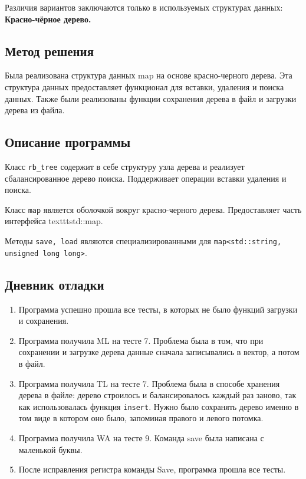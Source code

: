 \documentclass[12pt]{article}
\begin{document}
Различия вариантов заключаются только в используемых структурах данных:
\textbf{Красно-чёрное дерево.}

\newpage
\subsection*{Метод решения}

Была реализована структура данных map на основе красно-черного дерева.
Эта структура данных предоставляет функционал для вставки, удаления и поиска данных.
Также были реализованы функции сохранения дерева в файл и загрузки дерева из файла.

\subsection*{Описание программы}

Класс \texttt{rb\_tree} содержит в себе структуру узла дерева и реализует сбалансированное дерево
поиска. Поддерживает операции вставки удаления и поиска.

Класс \texttt{map} является оболочкой вокруг красно-черного дерева. Предоставляет часть интерфейса
texttt{std::map}.

Методы \texttt{save, load} являются специализированными для \texttt{map<std::string, unsigned long long>}.


\newpage
\subsection*{Дневник отладки}

\begin{enumerate}
    \item Программа успешно прошла все тесты, в которых не было функций загрузки и сохранения.
    \item Программа получила ML на тесте 7. Проблема была в том, что при сохранении и загрузке дерева данные сначала записывались в вектор, 
    а потом в файл.
    \item Программа получила TL на тесте 7. Проблема была в способе хранения дерева в файле: дерево строилось и балансировалось каждый раз заново,
    так как использовалась функция \texttt{insert}. Нужно было сохранять дерево именно в том виде в котором оно было, запоминая правого и левого потомка.
    \item Программа получила WA на тесте 9. Команда save была написана с маленькой буквы.
    \item После исправления регистра команды Save, программа прошла все тесты.
\end{enumerate}
\end{document}
